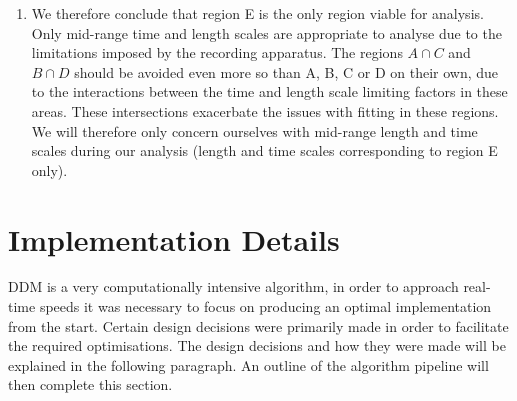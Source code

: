 \documentclass[11pt]{article}
\begin{document}
\begin{enumerate}[label=(\Alph*)]
\item We therefore conclude that region E is the only region viable for analysis. Only mid-range time and length scales are appropriate to analyse due to the limitations imposed by the recording apparatus. The regions $A \cap C$ and $B \cap D$ should be avoided even more so than A, B, C or D on their own, due to the interactions between the time and length scale limiting factors in these areas. These intersections exacerbate the issues with fitting in these regions. We will therefore only concern ourselves with mid-range length and time scales during our analysis (length and time scales corresponding to region E only).
\end{enumerate}


\section{Implementation Details}

DDM is a very computationally intensive algorithm, in order to approach real-time speeds it was necessary to focus on producing an optimal implementation from the start. Certain design decisions were primarily made in order to facilitate the required optimisations. The design decisions and how they were made will be explained in the following paragraph. An outline of the algorithm pipeline will then complete this section.
\\\\
\end{document}
